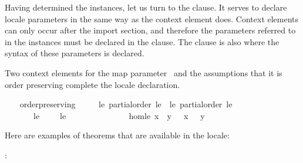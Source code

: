 \begin{isabellebody}
\begin{isamarkuptext}
  Having determined the instances, let us turn to the 
  clause.  It serves to declare locale parameters in the same way as
  the context element  does.  Context elements can
  only occur after the import section, and therefore the parameters
  referred to in the instances must be declared in the 
  clause.  The  clause is also where the syntax of these
  parameters is declared.

  Two context elements for the map parameter~ and the
  assumptions that it is order preserving complete the locale
  declaration.%
\end{isamarkuptext}%
\isamarkuptrue%
\ \ \isamarkupfalse%
\ order{}preserving\ {}\isanewline
\ \ \ \ le{}\ partial{}order\ le\ {}\ le{}{}\ partial{}order\ le{}\isanewline
\ \ \ \ \ \ \ le\ {}\ {}{}{}\ {}{}{}\ \ le{}\ {}\ {}{}{}\ {}{}{}\ {}\isanewline
\ \ \ \ \ {}\isanewline
\ \ \ \ \ hom{}le{}\ {}x\ {}\ y\ {}\ {}\ x\ {}\ {}\ y{}%
\begin{isamarkuptext}%
Here are examples of theorems that are
  available in the locale:

  \hspace*{1em}: 


\end{isamarkuptext}
\end{isabellebody}

